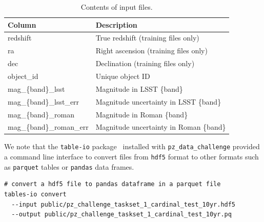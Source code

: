 \begin{table}[ht]
\centering
\caption{\label{tab:columns}\small Contents of input files.}
\begin{tabular}{ll}
  \hline\hline
  Column & Description \\ \hline  
  redshift & True redshift (training files only) \\
  ra & Right ascension (training files only) \\
  dec & Declination (training files only) \\
  object\_id & Unique object ID\\
  mag\_\{band\}\_lsst & Magnitude in LSST \{band\} \\
  mag\_\{band\}\_lsst\_err & Magnitude uncertainty in LSST \{band\} \\
  mag\_\{band\}\_roman & Magnitude in Roman \{band\} \\
  mag\_\{band\}\_roman\_err & Magnitude uncertainty in Roman \{band\} \\
\hline\hline
\end{tabular}
\end{table}

We note that the \texttt{table-io} package~
\cite{tables_io} installed with
\texttt{pz\_data\_challenge} provided a command line interface to
convert files from \texttt{hdf5} format to other formats such as
\texttt{parquet} tables or \texttt{pandas} data frames.

\begin{verbatim}
# convert a hdf5 file to pandas dataframe in a parquet file
tables-io convert
  --input public/pz_challenge_taskset_1_cardinal_test_10yr.hdf5
  --output public/pz_challenge_taskset_1_cardinal_test_10yr.pq
\end{verbatim}

